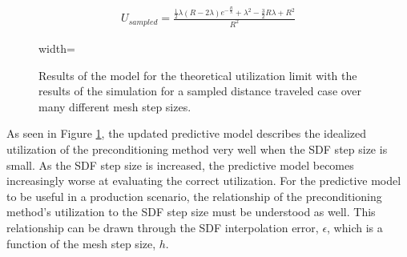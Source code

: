 
\begin{equation}
  \begin{split}
    U_{sampled} = \frac{\frac{1}{2} \lambda (R - 2 \lambda) e^{-\frac{R}{\lambda}} + \lambda^{2} - \frac{3}{2} R \lambda + R^{2} }{R^{2}}
  \end{split}
  \label{eq:sdf_model_sampled}
\end{equation}

\begin{figure}[ht] 
\centering
{width=\textwidth}
\caption[Pseudo-simulation results for sampled distances traveled.]{Results of
  the model for the theoretical utilization limit with the results of the
  simulation for a sampled distance traveled case over many different mesh step
  sizes.}
\label{fig:sdf_sampled_dist}
\end{figure}

As seen in Figure \ref{fig:sdf_sampled_dist}, the updated predictive model
describes the idealized utilization of the preconditioning method very well when
the SDF step size is small. As the SDF step size is increased, the predictive
model becomes increasingly worse at evaluating the correct utilization. For the
predictive model to be useful in a production scenario, the relationship of the
preconditioning method's utilization to the SDF step size must be understood as
well. This relationship can be drawn through the SDF interpolation error,
$\epsilon$, which is a function of the mesh step size, $h$.




